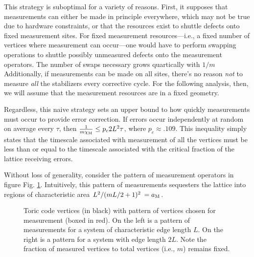 \documentclass[twocolumn,superscriptaddress,aps,prb,floatfix]{revtex4-1}
\newcommand{\figref}[1]{Fig. \ref{#1}}
\begin{document}
 This strategy is suboptimal for a variety of reasons.  First, it supposes that measurements can either be made in principle everywhere, which may not be true due to hardware constraints, or that the resources exist to shuttle defects onto fixed measurement sites.  For fixed measurement resources---i.e., a fixed number of vertices where measurement can occur---one would have to perform swapping operations to shuttle possibly unmeasured defects onto the measurement operators.  The number of swaps necessary grows quartically with $1/m$  Additionally, if measurements can be made on all sites, there's no reason \emph{not} to measure \emph{all} the stabilizers every corrective cycle.  For the following analysis, then, we will assume that the measurement resources are in a fixed geometry.

 Regardless, this naive strategy sets an upper bound to how quickly measurements must occur to provide error correction.  If errors occur independently at random on average every $\tau$, then $\frac{1}{m \chi_{\rm{M}}} \leq p_c 2L^2 \tau$, where $p_c\approx.109$.  This inequality simply states that the timescale associated with measurement of all the vertices must be less than or equal to the timescale associated with the critical fraction of the lattice receiving errors.
 
 Without loss of generality, consider the pattern of measurement operators in figure \figref{fig:MeasurementScaling}.  Intuitively, this pattern of measurements sequesters the lattice into regions of characteristic area $L^2 / (mL/2 + 1)^2 \:= a_{\rm{M}}$.
 

 
\begin{figure}
\begin{center}
\end{center}
\caption{Toric code vertices (in black) with pattern of vertices chosen for measurement (boxed in red).  On the left is a pattern of measurements for a system of characteristic edge length $L$.  On the right is a pattern for a system with edge length $2L$.  Note the fraction of measured vertices to total vertices (i.e., $m$) remains fixed.}
\label{fig:MeasurementScaling}
\end{figure}
\end{document}
